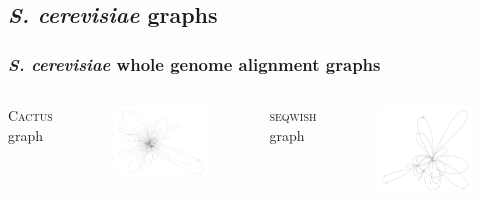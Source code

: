 \documentclass{beamer}
\begin{document}
\subsection{\emph{S. cerevisiae} graphs}

\begin{frame}[fragile]
  \frametitle{\emph{S. cerevisiae} whole genome alignment graphs}
  \begin{columns}[c] %
    \textsc{Cactus} graph %
    \begin{figure}
      \includegraphics[scale=0.18,center]{cactus_yeast.png}
    \end{figure}
    \textsc{seqwish} graph %
    \begin{figure}
      \includegraphics[scale=0.10,center]{seqwish_yeast.png}

\end{figure}
\end{columns}
\end{frame}
\end{document}
